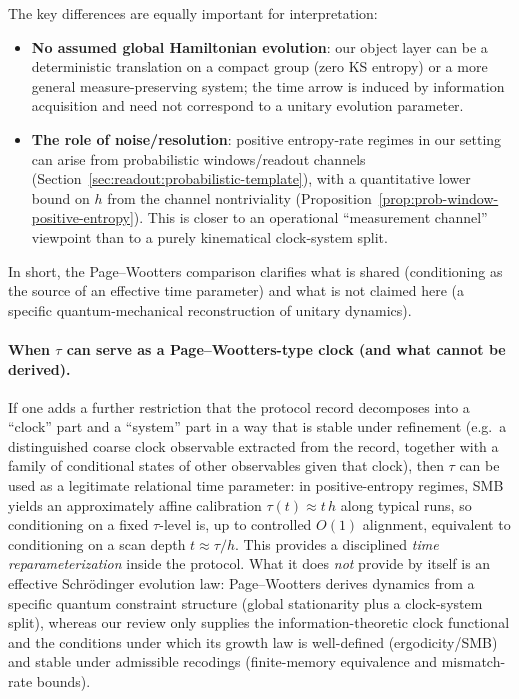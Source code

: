 The key differences are equally important for interpretation:
\begin{itemize}[leftmargin=*,itemsep=2pt]
  \item \textbf{No assumed global Hamiltonian evolution}: our object layer can be a deterministic translation on a compact group (zero KS entropy) or a more general measure-preserving system; the time arrow is induced by information acquisition and need not correspond to a unitary evolution parameter.
  \item \textbf{The role of noise/resolution}: positive entropy-rate regimes in our setting can arise from probabilistic windows/readout channels (Section~\ref{sec:readout:probabilistic-template}), with a quantitative lower bound on $h$ from the channel nontriviality (Proposition~\ref{prop:prob-window-positive-entropy}). This is closer to an operational ``measurement channel'' viewpoint than to a purely kinematical clock-system split.
\end{itemize}

In short, the Page--Wootters comparison clarifies what is shared (conditioning as the source of an effective time parameter) and what is not claimed here (a specific quantum-mechanical reconstruction of unitary dynamics).

\paragraph{When $\tau$ can serve as a Page--Wootters-type clock (and what cannot be derived).}
If one adds a further restriction that the protocol record decomposes into a ``clock'' part and a ``system'' part in a way that is stable under refinement (e.g.\ a distinguished coarse clock observable extracted from the record, together with a family of conditional states of other observables given that clock), then $\tau$ can be used as a legitimate relational time parameter:
in positive-entropy regimes, SMB yields an approximately affine calibration $\tau(t)\approx t\,h$ along typical runs, so conditioning on a fixed $\tau$-level is, up to controlled $O(1)$ alignment, equivalent to conditioning on a scan depth $t\approx \tau/h$.
This provides a disciplined \emph{time reparameterization} inside the protocol.
What it does \emph{not} provide by itself is an effective Schr\"odinger evolution law: Page--Wootters derives dynamics from a specific quantum constraint structure (global stationarity plus a clock-system split), whereas our review only supplies the information-theoretic clock functional and the conditions under which its growth law is well-defined (ergodicity/SMB) and stable under admissible recodings (finite-memory equivalence and mismatch-rate bounds).

